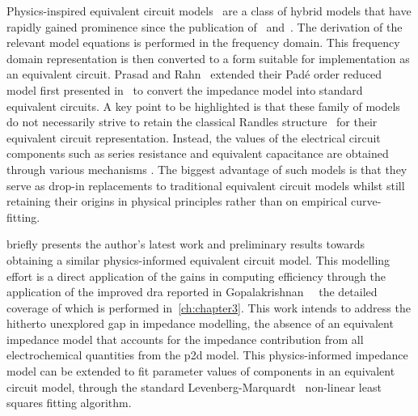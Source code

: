 Physics-inspired equivalent circuit models~\cite{Merla2018,Prasad2014,Zhang2017}
are  a  class  of  hybrid  models that  have  rapidly  gained  prominence  since
the publication  of~\cite{Jokar2016} and~\cite{Fan2015}.  The derivation  of the
relevant model  equations is performed  in the frequency domain.  This frequency
domain representation  is then converted  to a form suitable  for implementation
as  an  equivalent circuit.  Prasad  and  Rahn~\cite{Prasad2014} extended  their
Padé order  reduced model first  presented in~\cite{Prasad2013} to  convert the
impedance model into standard equivalent circuits. A key point to be highlighted
is  that  these  family of  models  do  not  necessarily  strive to  retain  the
classical  Randles  structure~\cite{Randles1947}  for their  equivalent  circuit
representation. Instead, the values of the electrical circuit components such as
series  resistance  and  equivalent  capacitance are  obtained  through  various
mechanisms . The biggest advantage of
such models is that they serve as drop-in replacements to traditional equivalent
circuit  models whilst  still  retaining their  origins  in physical  principles
rather than on empirical curve-fitting.


  briefly presents  the author's  latest work  and preliminary
results  towards   obtaining  a  similar  physics-informed   equivalent  circuit
model.  This  modelling  effort  is  a   direct  application  of  the  gains  in
computing  efficiency   through  the  application  of   the  improved  \gls{dra}
reported   in   Gopalakrishnan~\etal{}~\cite{Gopalakrishnan2017}  the   detailed
coverage  of  which  is   performed  in~\cref{ch:chapter3}.  This  work  intends
to  address  the hitherto  unexplored  gap  in  impedance modelling,  \ie{}  the
absence  of  an equivalent  impedance  model  that  accounts for  the  impedance
contribution from all electrochemical quantities  from the \gls{p2d} model. This
physics-informed  impedance  model  can  be extended  to  fit  parameter  values
of  components  in an  equivalent  circuit  model,  \eg{} through  the  standard
Levenberg-Marquardt~\cite{Levenberg1944, Marquardt1963} non-linear least squares
fitting algorithm.


